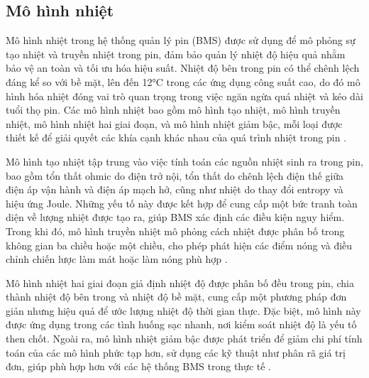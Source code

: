\documentclass{thesis}
\begin{document}
    \subsection{Mô hình nhiệt}
    Mô hình nhiệt trong hệ thống quản lý pin (BMS) được sử dụng để mô phỏng sự tạo nhiệt và truyền nhiệt trong pin, đảm bảo quản lý nhiệt độ hiệu quả nhằm bảo vệ an toàn và tối ưu hóa hiệu suất. Nhiệt độ bên trong pin có thể chênh lệch đáng kể so với bề mặt, lên đến 12°C trong các ứng dụng công suất cao, do đó mô hình hóa nhiệt đóng vai trò quan trọng trong việc ngăn ngừa quá nhiệt và kéo dài tuổi thọ pin. Các mô hình nhiệt bao gồm mô hình tạo nhiệt, mô hình truyền nhiệt, mô hình nhiệt hai giai đoạn, và mô hình nhiệt giảm bậc, mỗi loại được thiết kế để giải quyết các khía cạnh khác nhau của quá trình nhiệt trong pin \cite{kailong2019}.

    Mô hình tạo nhiệt tập trung vào việc tính toán các nguồn nhiệt sinh ra trong pin, bao gồm tổn thất ohmic do điện trở nội, tổn thất do chênh lệch điện thế giữa điện áp vận hành và điện áp mạch hở, cũng như nhiệt do thay đổi entropy và hiệu ứng Joule. Những yếu tố này được kết hợp để cung cấp một bức tranh toàn diện về lượng nhiệt được tạo ra, giúp BMS xác định các điều kiện nguy hiểm. Trong khi đó, mô hình truyền nhiệt mô phỏng cách nhiệt được phân bố trong không gian ba chiều hoặc một chiều, cho phép phát hiện các điểm nóng và điều chỉnh chiến lược làm mát hoặc làm nóng phù hợp \cite{kailong2019}.

    Mô hình nhiệt hai giai đoạn giả định nhiệt độ được phân bố đều trong pin, chia thành nhiệt độ bên trong và nhiệt độ bề mặt, cung cấp một phương pháp đơn giản nhưng hiệu quả để ước lượng nhiệt độ thời gian thực. Đặc biệt, mô hình này được ứng dụng trong các tình huống sạc nhanh, nơi kiểm soát nhiệt độ là yếu tố then chốt. Ngoài ra, mô hình nhiệt giảm bậc được phát triển để giảm chi phí tính toán của các mô hình phức tạp hơn, sử dụng các kỹ thuật như phân rã giá trị đơn, giúp phù hợp hơn với các hệ thống BMS trong thực tế \cite{kailong2019}.
\end{document}
